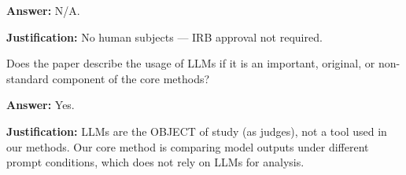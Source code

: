 \begin{neurlipschecklist}
  \textbf{Answer:} N/A.

  \textbf{Justification:} No human subjects — IRB approval not required.

\item[{\textbf{16.:}}]
  Does the paper describe the usage of LLMs if it is an important, original, or non-standard component of the core methods?

  \textbf{Answer:} Yes.

  \textbf{Justification:} LLMs are the OBJECT of study (as judges), not a tool used in our methods. Our core method is comparing model outputs under different prompt conditions, which does not rely on LLMs for analysis.

\end{neurlipschecklist}
